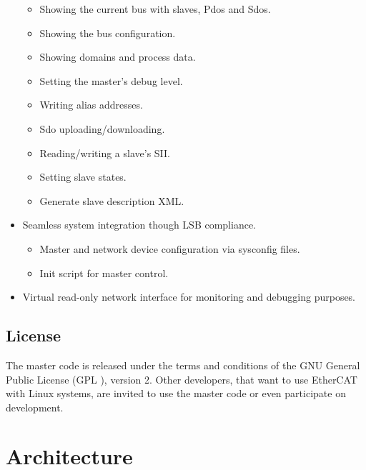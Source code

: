 \documentclass[a4paper,12pt,BCOR6mm,bibtotoc,idxtotoc]{scrbook}
\begin{document}
\begin{itemize}
\begin{itemize}
  \item Showing the current bus with slaves, Pdos and Sdos.
  \item Showing the bus configuration.
  \item Showing domains and process data.
  \item Setting the master's debug level.
  \item Writing alias addresses.
  \item Sdo uploading/downloading.
  \item Reading/writing a slave's SII.
  \item Setting slave states.
  \item Generate slave description XML.

  \end{itemize}

\item Seamless system integration though LSB compliance.

  \begin{itemize}

  \item Master and network device configuration via sysconfig files.

  \item Init script for master control.

  \end{itemize}

\item Virtual read-only network interface for monitoring and debugging
  purposes.

\end{itemize}


\section{License}
\label{sec:license}

The master code is released under the terms and conditions of the GNU General
Public License (GPL \cite{gpl}), version 2. Other developers, that
want to use EtherCAT with Linux systems, are invited to use the master code or
even participate on development.


\chapter{Architecture}
\label{sec:arch}
\end{document}
